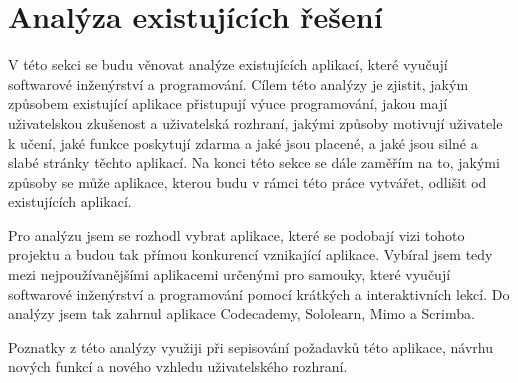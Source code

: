 \section{Analýza existujících řešení}

V této sekci se budu věnovat analýze existujících aplikací, které vyučují softwarové inženýrství a programování. Cílem této analýzy je zjistit, jakým způsobem existující aplikace přistupují výuce programování, jakou mají uživatelskou zkušenost a uživatelská rozhraní, jakými způsoby motivují uživatele k učení, jaké funkce poskytují zdarma a jaké jsou placené, a jaké jsou silné a slabé stránky těchto aplikací. Na konci této sekce se dále zaměřím na to, jakými způsoby se může aplikace, kterou budu v rámci této práce vytvářet, odlišit od existujících aplikací.

Pro analýzu jsem se rozhodl vybrat aplikace, které se podobají vizi tohoto projektu a budou tak přímou konkurencí vznikající aplikace. Vybíral jsem tedy mezi nejpoužívanějšími aplikacemi určenými pro samouky, které vyučují softwarové inženýrství a programování pomocí krátkých a interaktivních lekcí. Do analýzy jsem tak zahrnul aplikace Codecademy, Sololearn, Mimo a Scrimba.

Poznatky z této analýzy využiji při sepisování požadavků této aplikace, návrhu nových funkcí a nového vzhledu uživatelského rozhraní.

